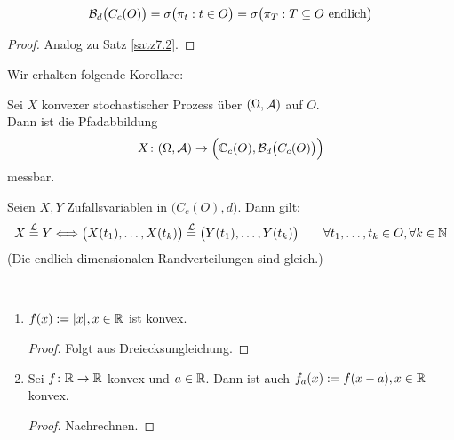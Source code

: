 \begin{satz}\label{satz9.2}
	\begin{align*}
		\mathcal{B}_d\big(C_c(O)\big)=\sigma\big(\pi_t:t\in O\big)=\sigma\big(\pi_T:T\subseteq O\text{ endlich}\big)
	\end{align*}
\end{satz}

\begin{proof}
	Analog zu Satz \ref{satz7.2}.
\end{proof}


Wir erhalten folgende Korollare:

\begin{korollar}\label{korollar9.3}
	 Sei $X$ konvexer stochastischer Prozess über $(\Omega,\mathcal{A})$ auf $O$.\\
	 Dann ist die Pfadabbildung
	 \begin{align*}
	 	X\colon(\Omega,\mathcal{A})\to\Big(\mathbb{C}_c(O),\mathcal{B}_d\big(C_c(O)\big)\Big)
	 \end{align*}
	 messbar.
\end{korollar}

\begin{korollar}\label{korollar9.4} %
	Seien $X,Y$ Zufallsvariablen in $\big(C_c(O),d\big)$.
	Dann gilt:
	\begin{align*}
		X\overset{\mathcal{L}}{=} Y\Longleftrightarrow
		\big(X(t_1),\ldots,X(t_k)\big)
		\overset{\mathcal{L}}{=}
		\big(Y(t_1),\ldots,Y(t_k)\big)
		\qquad\forall t_1,\ldots,t_k\in O,\forall k\in\mathbb{N}
	\end{align*}
	(Die endlich dimensionalen Randverteilungen sind gleich.)
\end{korollar}

\begin{beispiel}\label{beispiel9.5}\
	\begin{enumerate}[label=(\arabic*)]
		\item $f(x):=|x|,x\in\mathbb{R}$ ist konvex.
		\begin{proof}
			Folgt aus Dreiecksungleichung.
		\end{proof}
		\item Sei $f\colon\mathbb{R}\to\mathbb{R}$ konvex und $a\in\mathbb{R}$.
		Dann ist auch $f_a(x):=f(x-a),x\in\mathbb{R}$ konvex.
		\begin{proof}
			Nachrechnen.
		\end{proof}
	\end{enumerate}
\end{beispiel}

